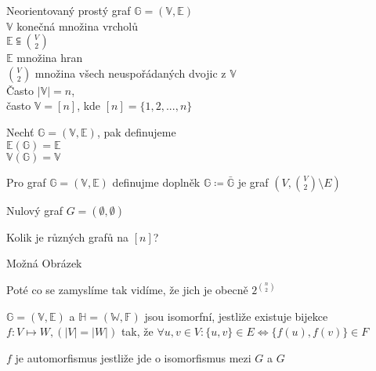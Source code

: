 \documentclass[../main.tex]{subfiles}
\begin{document}
\begin{definition}


    Neorientovaný prostý graf $\mathbb{G} = (\mathbb{V}, \mathbb{E})$ \\
    $\mathbb{V}$ konečná množina vrcholů \\
    $\mathbb{E} \subseteqq \binom{V}{2}$ \\
    $\mathbb{E} $ množina hran\\
    $\binom{V}{2}$  množina všech neuspořádaných dvojic z $\mathbb{V}$ \\


    Často $|\mathbb{V}|=n$,\\
    často $\mathbb{V} = [n]$, kde $[n] = \{1,2,...,n\}$ 
\end{definition}


\begin{definition}
    Nechť $\mathbb{G} = (\mathbb{V}, \mathbb{E})$, pak definujeme \\
    $\mathbb{E}(\mathbb{G}) = \mathbb{E}$\\
    $\mathbb{V}(\mathbb{G}) = \mathbb{V}$
\end{definition}

\begin{definition}
    Pro graf $\mathbb{G} = (\mathbb{V}, \mathbb{E})$ definujme  doplněk $\mathbb{G} \coloneq \bar{\mathbb{G}}$ je graf $(V, \binom{V}{2}\setminus E )$
\end{definition}

\begin{definition}
    Nulový graf $G = (\emptyset, \emptyset)$ 
\end{definition}

\begin{example}
    Kolik je různých grafů na $[n]$?

    Možná Obrázek

    Poté co se zamyslíme tak vidíme, že jich je obecně $2^{\binom{n}{2}}$
\end{example}



\begin{definition}
    $\mathbb{G} = (\mathbb{V}, \mathbb{E})$ a $\mathbb{H} = (\mathbb{W}, \mathbb{F})$ jsou isomorfní, jestliže existuje bijekce 
    $f: V \mapsto W, (|V| = |W|)$ tak, že $\forall u,v \in V: \{u, v\}\in E \Leftrightarrow \{ f(u), f(v) \} \in F$
\end{definition}


\begin{definition}
    $f$ je automorfismus jestliže jde o isomorfismus mezi $G$ a $G$ 
\end{definition}
\end{document}
